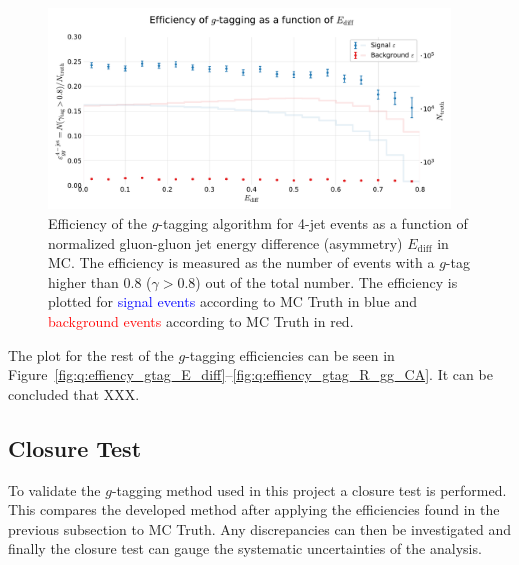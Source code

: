 \begin{figure}
  \centerfloat
  \includegraphics[width=0.95\textwidth, trim=10 10 10 45, clip, page=1]{figures/quarks/efficiency_events-down_sample=1.00-ML_vars=vertex-selection=b-ejet_min=4-n_iter_RS_lgb=99-n_iter_RS_xgb=9-cdot_cut=0.90-version=19-njet=4.pdf}
  \caption[$g$-Tagging Efficiency for 4-Jet Events in MC as a Function of the Normalized Gluon-Gluon Jet Energy Difference Asymmetry $E_\mathrm{diff}$]
          {Efficiency of the $g$-tagging algorithm for 4-jet events as a function of normalized gluon-gluon jet energy difference (asymmetry) $E_\mathrm{diff}$  in MC. The efficiency is measured as the number of events with a $g$-tag higher than 0.8 ($\gamma > 0.8$) out of the total number. The efficiency is plotted for \textcolor{blue}{signal events} according to MC Truth in blue and \textcolor{red}{background events} according to MC Truth in red.
          } 
  \label{fig:q:effiency_gtag_E_diff_non_appendix}
\end{figure}

The plot for the rest of the $g$-tagging efficiencies can be seen in Figure~\ref{fig:q:effiency_gtag_E_diff}--\ref{fig:q:effiency_gtag_R_gg_CA}. It can be concluded that XXX. 

\subsection{Closure Test}
\label{subsec:q:gluon_splitting_closure}

To validate the $g$-tagging method used in this project a closure test is performed. This compares the developed method after applying the efficiencies found in the previous subsection to MC Truth. Any discrepancies can then be investigated and finally the closure test can gauge the systematic uncertainties of the analysis. 

